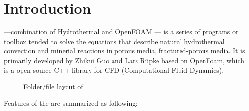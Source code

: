 \section{Introduction}

\foam ---combination of Hydrothermal and \href{https://openfoam.org}{OpenFOAM} --- 
is a series of programs or toolbox tended to solve the equations that describe natural hydrothermal convection and minerial reactions in porous media, fractured-porous media.
It is primarily developed by Zhikui Guo and Lars Rüpke based on OpenFoam, which is a open source C++ library for CFD (Computational Fluid Dynamics).
\begin{figure}[htpb]
	\centering
	
	\caption{Folder/file layout of \foam}
	\label{fig:filetree_main}
\end{figure}

Features of the \foam are summarized as following: 

